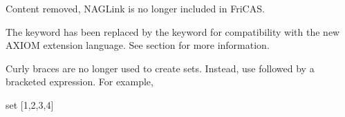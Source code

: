 %
%



Content removed, NAGLink is no longer included in FriCAS.



The  keyword has been replaced by the
 keyword for compatibility with the new AXIOM
extension language.
See section 
for more information.

Curly braces are no longer used to create sets. Instead, use
 followed by a bracketed expression. For example,
\begin{xtc}
\begin{xtccomment}
\end{xtccomment}
\begin{spadsrc}
set [1,2,3,4]
\end{spadsrc}
\begin{TeXOutput}
\begin{fricasmath}{1}
%
\end{fricasmath}
\end{TeXOutput}
\end{xtc}

